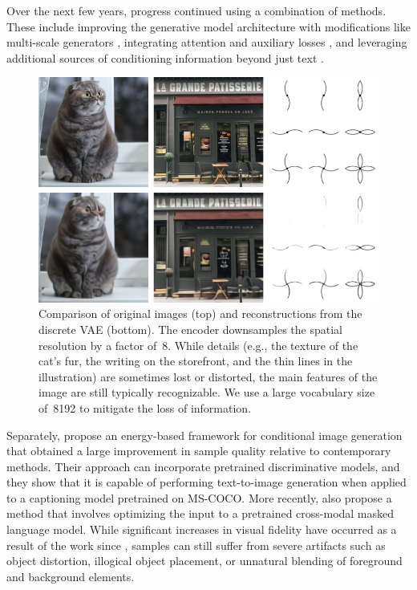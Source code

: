 \documentclass{article}
\begin{document}
Over the next few years, progress continued using a combination of methods. These include improving the generative model architecture with modifications like multi-scale generators \citep{zhang2017stackgan,zhang2018stackgan++}, integrating attention and auxiliary losses \citep{xu2018attngan}, and leveraging additional sources of conditioning information beyond just text \citep{reed2016learning,li2019object,koh2021text}.

\begin{figure}
    \centering
    \includegraphics[width=\linewidth]{dvae_rec.png}
    \caption{Comparison of original images (top) and reconstructions from the discrete VAE (bottom). The encoder downsamples the spatial resolution by a factor of~8. While details (e.g., the texture of the cat's fur, the writing on the storefront, and the thin lines in the illustration) are sometimes lost or distorted, the main features of the image are still typically recognizable. We use a large vocabulary size of~8192 to mitigate the loss of information.}
    \label{fig:dvae_rec}
\end{figure}
%
Separately, \citet{nguyen2017plug} propose an energy-based framework for conditional image generation that obtained a large improvement in sample quality relative to contemporary methods. Their approach can incorporate pretrained discriminative models, and they show that it is capable of performing text-to-image generation when applied to a captioning model pretrained on MS-COCO.
More recently, \citet{cho2020x} also propose a method that involves optimizing the input to a pretrained cross-modal masked language model. While significant increases in visual fidelity have occurred as a result of the work since \citet{mansimov2015generating}, samples can still suffer from severe artifacts such as object distortion, illogical object placement, or unnatural blending of foreground and background elements.
\end{document}
